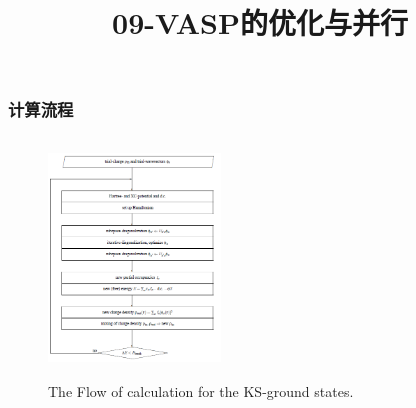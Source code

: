 {\frame
{
	\frametitle{计算流程}
\begin{figure}[h!]
	\vspace{-0.2in}
\centering
\includegraphics[height=2.5in,width=1.8in,viewport=0 0 480 630,clip]{Figures/VASP_procedure.png}
\caption{\tiny \textrm{The Flow of calculation for the KS-ground states.}}%
\label{PAW_baiseset}
\end{figure} 
}
\title{09-\rm{VASP}的优化与并行}
%

}
